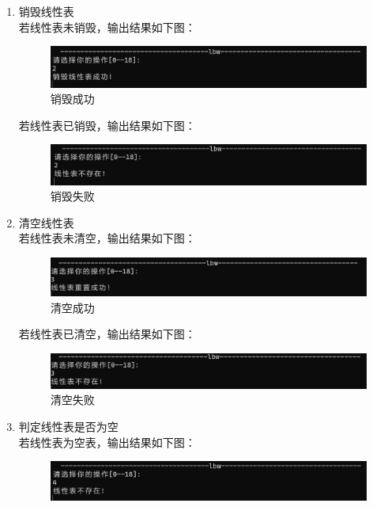 \documentclass[supercite]{Experimental_Report}
\theoremstyle{definition}
\begin{document}
\begin{enumerate}
		\item 销毁线性表\\
		若线性表未销毁，输出结果如下图：
		\begin{figure}[H]
			\centering
			\includegraphics[width=1\linewidth]{images/销毁成功.png}
			\caption{销毁成功}
			\label{fig1-10}
		\end{figure}
		若线性表已销毁，输出结果如下图：
		\begin{figure}[H]
			\centering
			\includegraphics[width=1\linewidth]{images/销毁失败.png}
			\caption{销毁失败}
			\label{fig1-11}
		\end{figure}
		\item 清空线性表\\
		若线性表未清空，输出结果如下图：
		\begin{figure}[H]
			\centering
			\includegraphics[width=1\linewidth]{images/清空成功.png}
			\caption{清空成功}
			\label{fig1-12}
		\end{figure}
			若线性表已清空，输出结果如下图：
			\begin{figure}[H]
				\centering
				\includegraphics[width=1\linewidth]{images/清空失败.png}
				\caption{清空失败}
				\label{fig1-13}
			\end{figure}
		\item 判定线性表是否为空\\
		若线性表为空表，输出结果如下图：
		\begin{figure}[H]
			\centering
			\includegraphics[width=1\linewidth]{images/判空失败.png}

\end{figure}
\end{enumerate}
\end{document}
